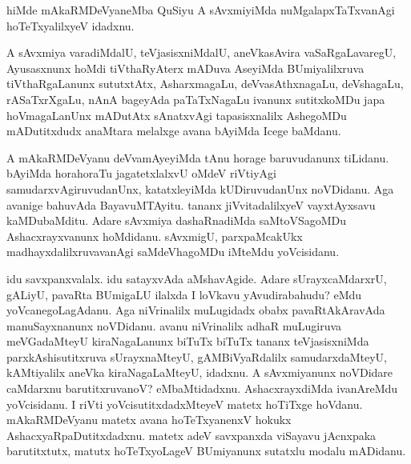 \begin{mng}
hiMde mAkaRMDeVyaneMba QuSiyu A sAvxmiyiMda nuMgalapxTaTxvanAgi hoTeTxyalilxyeV idadxnu. 
\end{mng}

\begin{mng}
A sAvxmiya varadiMdalU, teVjasisxniMdalU, aneVkasAvira vaSaRgaLavaregU, Ayusasxnunx hoMdi tiVthaRyAterx mADuva AseyiMda BUmiyalilxruva tiVthaRgaLanunx sututxtAtx, AsharxmagaLu, deVvasAthxnagaLu, deVshagaLu, rASaTxrXgaLu, nAnA bageyAda paTaTxNagaLu ivanunx sutitxkoMDu japa hoVmagaLanUnx mADutAtx sAnatxvAgi tapasisxnalilx AshegoMDu mADutitxdudx anaMtara melalxge avana bAyiMda Icege baMdanu.
\end{mng}

\begin{mng}
A mAkaRMDeVyanu deVvamAyeyiMda tAnu horage baruvudanunx tiLidanu. bAyiMda horahoraTu jagatetxlalxvU oMdeV riVtiyAgi samudarxvAgiruvudanUnx, katatxleyiMda kUDiruvudanUnx noVDidanu. Aga avanige bahuvAda BayavuMTAyitu. tananx jiVvitadalilxyeV vayxtAyxsavu kaMDubaMditu. Adare sAvxmiya dashaRnadiMda saMtoVSagoMDu Ashacxrayxvanunx hoMdidanu. sAvxmigU, parxpaMcakUkx madhayxdalilxruvavanAgi saMdeVhagoMDu iMteMdu yoVcisidanu.
\end{mng}

\begin{mng}
idu savxpanxvalalx. idu satayxvAda aMshavAgide. Adare sUrayxcaMdarxrU, gALiyU, pavaRta BUmigaLU ilalxda I loVkavu yAvudirabahudu? eMdu yoVcanegoLagAdanu. Aga niVrinalilx muLugidadx obabx pavaRtAkAravAda manuSayxnanunx noVDidanu. avanu niVrinalilx adhaR muLugiruva meVGadaMteyU kiraNagaLanunx biTuTx biTuTx tananx teVjasisxniMda parxkAshisutitxruva sUrayxnaMteyU, gAMBiVyaRdalilx samudarxdaMteyU, kAMtiyalilx aneVka kiraNagaLaMteyU, idadxnu. A sAvxmiyanunx noVDidare caMdarxnu barutitxruvanoV? eMbaMtidadxnu. AshacxrayxdiMda ivanAreMdu yoVcisidanu. I riVti yoVcisutitxdadxMteyeV matetx hoTiTxge hoVdanu. mAkaRMDeVyanu matetx avana hoTeTxyanenxV hokukx AshacxyaRpaDutitxdadxnu. matetx adeV savxpanxda viSayavu jAcnxpaka barutitxtutx, matutx hoTeTxyoLageV BUmiyanunx sutatxlu modalu mADidanu.
\end{mng}

